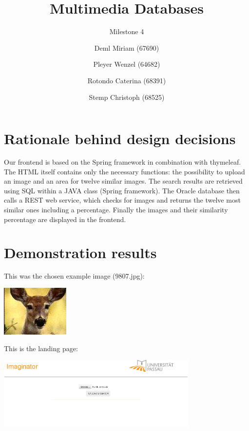 \documentclass{llncs}
\date{}
\title{Multimedia Databases}
\subtitle{Milestone 4}
\author{Deml Miriam (67690) \and Pleyer Wenzel (64682) \and Rotondo Caterina (68391) \and Stemp Christoph (68525)}
\institute{}
\begin{document}
\maketitle

\section{Rationale behind design decisions}
Our frontend is based on the Spring framework in combination with thymeleaf. The HTML itself contains only the necessary functions: the possibility to upload an image and an area for twelve similar images. The search results are retrieved using SQL within a JAVA class (Spring framework). The Oracle database then calls a REST web service, which checks for images and returns the twelve most similar ones including a percentage. Finally the images and their similarity percentage are displayed in the frontend. 

\section{Demonstration results}
This was the chosen example image (9807.jpg):
\begin{center}
	\includegraphics{images/9807.jpg}
\end{center}

\newpage

This is the landing page:
\begin{center}
	\includegraphics[width=10cm]{images/landing.png}
\end{center}
\end{document}
